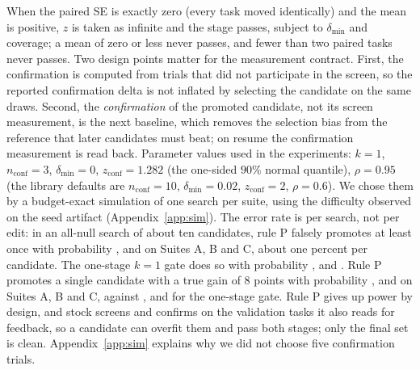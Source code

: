 When the paired SE is exactly zero (every task moved identically) and the mean is positive, $z$ is taken as infinite and the stage passes, subject to $\delta_{\min}$ and coverage; a mean of zero or less never passes, and fewer than two paired tasks never passes.
Two design points matter for the measurement contract. First, the confirmation is computed from trials that did not
participate in the screen, so the reported confirmation delta is not inflated by selecting the candidate on the same
draws. Second, the \emph{confirmation} of the promoted candidate, not its screen measurement, is the next baseline,
which removes the selection bias from the reference that later candidates must beat; on resume the confirmation
measurement is read back.
Parameter values used in the experiments: $k=1$, $n_{\mathrm{conf}}=3$, $\delta_{\min}=0$,
$z_{\mathrm{conf}}=1.282$ (the one-sided $90\%$ normal quantile), $\rho=0.95$ (the library defaults are $n_{\mathrm{conf}}=10$,
$\delta_{\min}=0.02$, $z_{\mathrm{conf}}=2$, $\rho=0.6$). We chose them by a budget-exact simulation of one search per suite, using the difficulty observed on the seed artifact (Appendix~\ref{app:sim}). The error rate is per search, not per edit: in an all-null search of about ten candidates, rule P falsely promotes at least once with probability \simPFalseA{}, \simPFalseB{} and \simPFalseC{} on Suites A, B and C, about one percent per candidate. The one-stage $k=1$ gate does so with probability \simKoneFalseA{}, \simKoneFalseB{} and \simKoneFalseC{}. Rule P promotes a single candidate with a true gain of 8 points with probability \simPPowerEightA{}, \simPPowerEightB{} and \simPPowerEightC{} on Suites A, B and C, against \simKonePowerEightA{}, \simKonePowerEightB{} and \simKonePowerEightC{} for the one-stage gate. Rule P gives up power by design, and stock \capevolve{} screens and confirms on the validation tasks it also reads for feedback, so a candidate can overfit them and pass both stages; only the final set is clean. Appendix~\ref{app:sim} explains why we did not choose five confirmation trials.
